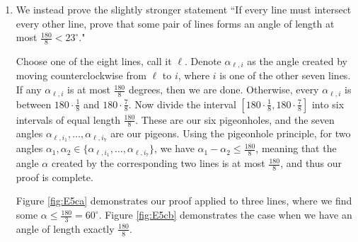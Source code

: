 \documentclass{article}
\newcounter{counter}
\begin{document}
\begin{enumerate}
        \vspace{1.5mm}
        Let $\theta = \angle C_1OC_{2}$, $a = |OC_{1}|$, $b = |OC_{2}|$, and $c = C_{1}C_{2}$, the line segment connecting $C_{1}$ and $C_{2}$. Now by the law of cosines, $$c^{2} = a^{2} + b^{2} - 2ab\cos(\theta).$$ Noting that $0 \le \theta \le 60^{\circ}$, $$c^{2} = a^{2} + b^{2} - 2ab\cos(\theta) \le a^{2} + b^{2} - 2ab\frac{1}{2} = a^{2} + b^{2} - ab.$$
        Simplifying this expression is a little tricky. We know $a + b > a$, so $(a - b)(a + b) > a(a - b)$, so $a^{2} - b^{2} > a^{2} - ab$. Finally, we obtain the result $$c^{2} = a^{2} + b^{2} - ab < a^{2} + b^{2} - b^{2} = a^{2} \implies c < a.$$
        
        
        This means that the distance between the two centers is less than the radius of the larger circle, so the larger circle contains the center of the smaller circle. This is a contradiction, therefore the six circles cannot have a point in common.
        \item \qquad We instead prove the slightly stronger statement ``If every line must intersect every other line, prove that some pair of lines forms an angle of length at most $\frac{180}{8} < 23^{\circ}$."
        
        \vspace{1.5mm}
        \qquad Choose one of the eight lines, call it $\ell$. Denote $\alpha_{\ell, i}$ as the angle created by moving counterclockwise from $\ell$ to $i$, where $i$ is one of the other seven lines. If any $\alpha_{\ell, i}$ is at most $\frac{180}{8}$ degrees, then we are done. Otherwise, every $\alpha_{\ell, i}$ is between $180 \cdot \frac{1}{8}$ and $180 \cdot \frac{7}{8}$. Now divide the interval $[180 \cdot \frac{1}{8}, 180 \cdot \frac{7}{8}]$ into six intervals of equal length $\frac{180}{8}$. These are our six pigeonholes, and the seven angles $\alpha_{\ell, i_{1}}, \dots, \alpha_{\ell, i_{7}}$ are our pigeons. Using the pigeonhole principle, for two angles $\alpha_{1}, \alpha_{2} \in \{\alpha_{\ell, i_{1}}, \dots, \alpha_{\ell, i_{7}}\}$, we have $\alpha_{1} - \alpha_{2} \le \frac{180}{8}$, meaning that the angle $\alpha$ created by the corresponding two lines is at most $\frac{180}{8}$, and thus our proof is complete.
        
        \vspace{1.5mm}
        \qquad Figure \ref{fig:E5ca} demonstrates our proof applied to three lines, where we find some $\alpha \le \frac{180}{3} = 60^{\circ}$. Figure \ref{fig:E5cb} demonstrates the case when we have an angle of length exactly $\frac{180}{8}$.
        

\end{enumerate}
\end{document}
